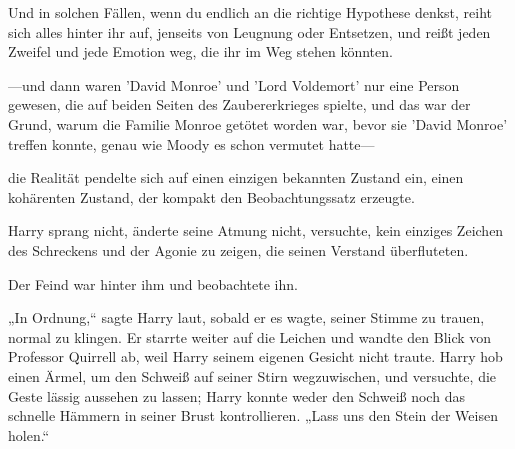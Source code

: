 Und in solchen Fällen, wenn du endlich an die richtige Hypothese denkst, reiht sich alles hinter ihr auf, jenseits von Leugnung oder Entsetzen, und reißt jeden Zweifel und jede Emotion weg, die ihr im Weg stehen könnten.

—und dann waren 'David Monroe' und 'Lord Voldemort' nur eine Person gewesen, die auf beiden Seiten des Zaubererkrieges spielte, und das war der Grund, warum die Familie Monroe getötet worden war, bevor sie 'David Monroe' treffen konnte, genau wie Moody es schon vermutet hatte—

die Realität pendelte sich auf einen einzigen bekannten Zustand ein, einen kohärenten Zustand, der kompakt den Beobachtungssatz erzeugte.

Harry sprang nicht, änderte seine Atmung nicht, versuchte, kein einziges Zeichen des Schreckens und der Agonie zu zeigen, die seinen Verstand überfluteten.

Der Feind war hinter ihm und beobachtete ihn.

„In Ordnung,“ sagte Harry laut, sobald er es wagte, seiner Stimme zu trauen, normal zu klingen. Er starrte weiter auf die Leichen und wandte den Blick von Professor Quirrell ab, weil Harry seinem eigenen Gesicht nicht traute. Harry hob einen Ärmel, um den Schweiß auf seiner Stirn wegzuwischen, und versuchte, die Geste lässig aussehen zu lassen; Harry konnte weder den Schweiß noch das schnelle Hämmern in seiner Brust kontrollieren.
„Lass uns den Stein der Weisen holen.“

